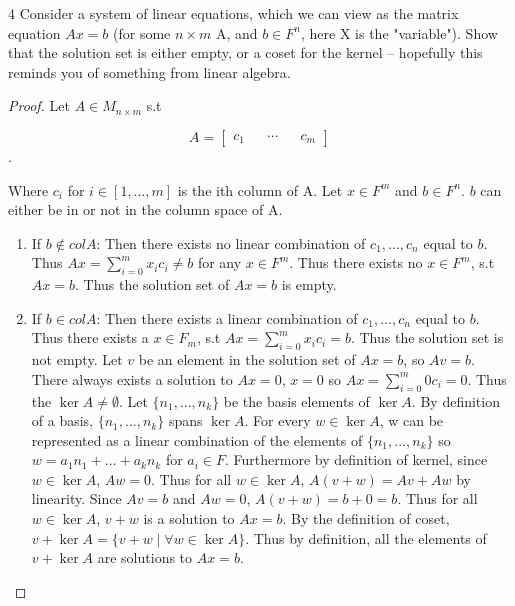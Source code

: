 \documentclass{article}
\begin{document}
\bigskip

\begin{PROB}{4}\label{Problem 4.}
    Consider a system of linear equations, which we can view as the matrix equation $Ax = b$ (for some $n \times m$ A, and $b \in F^n$, here X is the "variable"). Show that the solution set is either empty, or a coset for the kernel -- hopefully this reminds you of something from linear algebra.
\end{PROB}
\begin{proof}
    Let $A \in M_{n \times m}$ s.t 

    \begin{equation}{}
        A = 
        \begin{bmatrix}{}
            c_1 && \cdots && c_m
        \end{bmatrix}
    \end{equation}.

    Where $c_i$ for $i \in [1, \ldots, m]$ is the ith column of A. Let $x \in F^m$ and $b \in F^n$. $b$ can either be in or not in the column space of A.

    \begin{enumerate}
        \item If $b \not \in col A$: Then there exists no linear combination of $c_1, \ldots,c_n$ equal to $b$. Thus $Ax = \sum_{i = 0}^m x_ic_i \neq b$ for any $x \in F^m$. Thus there exists no $x \in F^m$, s.t $Ax = b$. Thus the solution set of $Ax = b$ is empty.
        \item If $b \in col A$: Then there exists a linear combination of $c_1, \ldots,c_n$ equal to $b$. Thus there exists a $x \in F_m$, s.t $Ax = \sum_{i = 0}^m x_ic_i = b$. Thus the solution set is not empty. Let $v$ be an element in the solution set of $Ax = b$, so $Av = b$. There always exists a solution to $Ax = 0$, $x = 0$ so $Ax = \sum_{i = 0}^m 0c_i = 0$. Thus the $\ker A \neq \emptyset$. Let $\{n_1, ..., n_k\}$ be the basis elements of $\ker A$. By definition of a basis, $\{n_1, ..., n_k\}$ spans $\ker A$. For every $w \in \ker A$, w can be represented as a linear combination of the elements of $\{n_1, ..., n_k\}$ so $w = a_1n_1 + \ldots  + a_kn_k$ for $a_i \in F$. Furthermore by definition of kernel, since $w \in \ker A$, $Aw = 0$. Thus for all $w \in \ker A$, $A(v + w) = Av + Aw$ by linearity. Since $Av = b$ and $Aw = 0$, $A(v + w) = b + 0 = b$. Thus for all $w \in \ker A$, $v + w$ is a solution to $Ax = b$. By the definition of coset, $v + \ker A = \{ v + w \mid \forall w \in \ker A \}$. Thus by definition, all the elements of $v + \ker A$ are solutions to $Ax = b$.
        

\end{enumerate}
\end{proof}
\end{document}
